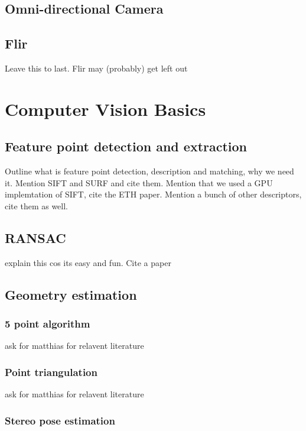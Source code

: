 \subsection{Omni-directional Camera}

\subsection{Flir}
Leave this to last.  Flir may (probably) get left out

\section{Computer Vision Basics}

\subsection{Feature point detection and extraction}

Outline what is feature point detection, description and matching, why we need
it.  Mention SIFT
and SURF and cite them.  Mention that we used a GPU implemtation of SIFT, cite
the ETH paper. 
Mention a bunch of other descriptors, cite them as well.

\subsection{RANSAC}

explain this cos its easy and fun.  Cite a paper

\subsection{Geometry estimation}

\subsubsection{5 point algorithm}

ask for matthias for relavent literature

\subsubsection{Point triangulation}

ask for matthias for relavent literature

\subsubsection{Stereo pose estimation}

